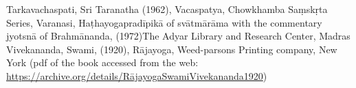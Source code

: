
\begin{thebibliography}{9}
 Tarkavachaspati, Sri Taranatha (1962), Vacaspatya, Chowkhamba Saṃskṛta Series, Varanasi, 
 Haṭhayogapradīpikā of svātmārāma with the commentary jyotsnā  of Brahmānanda, (1972)The Adyar Library and Research Center, Madras 
 Vivekananda, Swami,  (1920), Rājayoga, Weed-parsons Printing company, New York (pdf of the book accessed from the web: \url{https://archive.org/details/RājayogaSwamiVivekananda1920})
\end{thebibliography}
